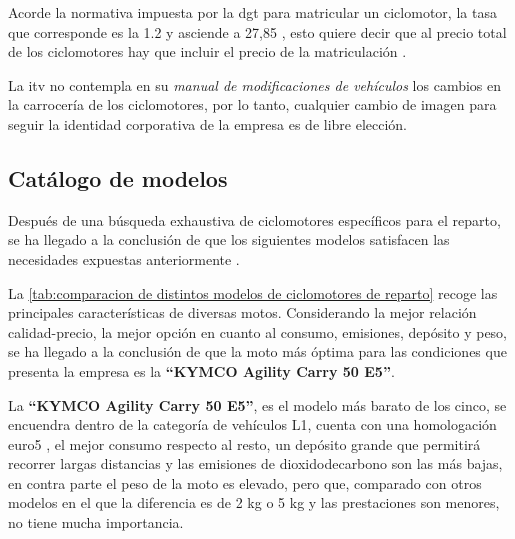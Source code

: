 Acorde la normativa impuesta por la \gls{dgt} para matricular un ciclomotor, la tasa que corresponde es la 1.2 y asciende a 27,85 , esto quiere decir que al precio total de los ciclomotores hay que incluir el precio de la matriculación  \cite{dgtciclomotores}.






La \gls{itv} no contempla en su \textit{manual de modificaciones de vehículos} \cite{itvciclomotores} los cambios en la carrocería de los ciclomotores, por lo tanto, cualquier cambio de imagen para seguir la identidad corporativa de la empresa es de libre elección.

\subsection{Catálogo de modelos}
Después de una búsqueda exhaustiva de ciclomotores específicos para el reparto, se ha llegado a la conclusión de que los siguientes modelos satisfacen las necesidades expuestas anteriormente \cite{kymcofichatecnica, apriliafichatecnica, piaggiofichatecnica,peugeotfichatecnicars,peugeotfichatecnicaspeed,apriliasxr50,motormapfre}.


La \autoref{tab:comparacion de distintos modelos de ciclomotores de reparto} recoge las principales características de diversas motos. Considerando la mejor relación calidad-precio, la mejor opción en cuanto al consumo, emisiones, depósito y peso, se ha llegado a la conclusión de que la moto más óptima para las condiciones que presenta la empresa es la \textbf{``KYMCO Agility Carry 50 E5''}.

La \textbf{``KYMCO Agility Carry 50 E5''}, es el modelo más barato de los cinco, se encuendra dentro de la categoría de vehículos L1, cuenta con una homologación \gls{euro5} \cite{euro5}, el mejor consumo respecto al resto, un depósito grande que permitirá recorrer largas distancias y las emisiones de \gls{dioxidodecarbono} son las más bajas, en contra parte el peso de la moto es elevado, pero que, comparado con otros modelos en el que la diferencia es de 2 \gls{kg} o 5 \gls{kg} y las prestaciones son menores, no tiene mucha importancia.

